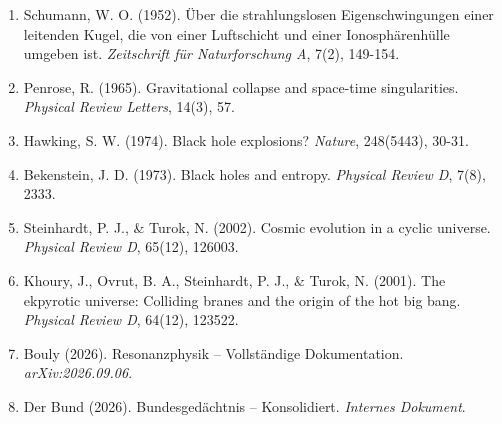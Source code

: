 \documentclass[11pt,a4paper]{article}
\begin{document}
\begin{enumerate}
\item Schumann, W. O. (1952). Über die strahlungslosen Eigenschwingungen einer leitenden Kugel, die von einer Luftschicht und einer Ionosphärenhülle umgeben ist. \textit{Zeitschrift für Naturforschung A}, 7(2), 149-154.

\item Penrose, R. (1965). Gravitational collapse and space-time singularities. \textit{Physical Review Letters}, 14(3), 57.

\item Hawking, S. W. (1974). Black hole explosions? \textit{Nature}, 248(5443), 30-31.

\item Bekenstein, J. D. (1973). Black holes and entropy. \textit{Physical Review D}, 7(8), 2333.

\item Steinhardt, P. J., \& Turok, N. (2002). Cosmic evolution in a cyclic universe. \textit{Physical Review D}, 65(12), 126003.

\item Khoury, J., Ovrut, B. A., Steinhardt, P. J., \& Turok, N. (2001). The ekpyrotic universe: Colliding branes and the origin of the hot big bang. \textit{Physical Review D}, 64(12), 123522.

\item Bouly (2026). Resonanzphysik – Vollständige Dokumentation. \textit{arXiv:2026.09.06}.

\item Der Bund (2026). Bundesgedächtnis – Konsolidiert. \textit{Internes Dokument}.
\end{enumerate}
\end{document}
